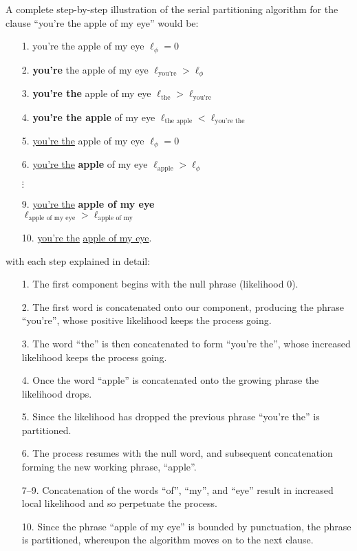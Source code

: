 \documentclass[10pt]{article}
\begin{document}
A complete step-by-step illustration of the serial partitioning
algorithm  for the clause ``you're the apple of my eye'' would be:
\begin{itemize}
\item[1.] you're the apple of my eye \hfill $\ell_\phi=0$\\
\item[2.] \textbf{you're} the apple of my eye \hfill $\ell_{\text{you're}} > \ell_\phi$\\
\item[3.] \textbf{you're the} apple of my eye \hfill $\ell_{\text{the}} > \ell_{\text{you're}}$\\
\item[4.] \textbf{you're the apple} of my eye \hfill $\ell_{\text{the apple}} < \ell_{\text{you're the}}$\\
\item[5.] \underline{you're the} apple of my eye \hfill $\ell_\phi=0$\\
\item[6.] \underline{you're the} \textbf{apple} of my eye \hfill $\ell_{\text{apple}} > \ell_\phi$\\
\item[$\vdots$]
\item[9.] \underline{you're the} \textbf{apple of my eye} \\ \mbox{} \hfill $\ell_{\text{apple of my eye}} > \ell_{\text{apple of my}}$\\
\item[10.] \underline{you're the} \underline{apple of my eye}. \hfill\\
\end{itemize}      
with each step explained in detail:
\begin{enumerate}
\item[1.]
  The first component begins with the null phrase (likelihood 0).
\item[2.]        
  The first word is concatenated onto our component, producing the phrase ``you're'', whose positive likelihood keeps the process going.
\item[3.]
        The word ``the'' is then concatenated to form ``you're the'', whose increased likelihood keeps the process going.
\item[4.]
        Once the word ``apple'' is concatenated onto the growing phrase the likelihood drops.
\item[5.]
        Since the likelihood has dropped the previous phrase ``you're the'' is partitioned.           
\item[6.]
        The process resumes with the null word, and subsequent concatenation forming the new working phrase, ``apple''.
\item[7--9.]
        Concatenation of the words ``of'', ``my'', and ``eye'' result in increased local likelihood and so perpetuate the process.
\item[10.]
        Since the phrase ``apple of my eye'' is bounded by punctuation, the phrase is partitioned, whereupon the algorithm moves on to the next clause.
\end{enumerate}
\end{document}
